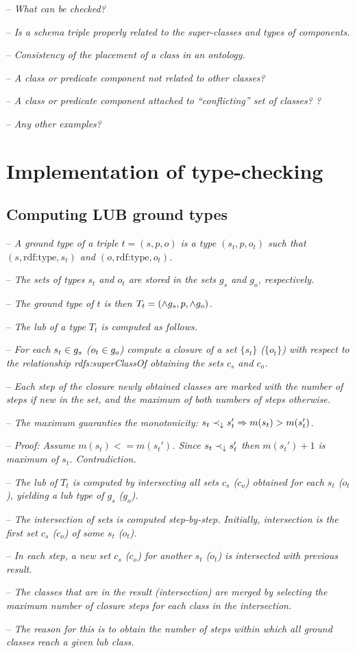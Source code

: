 \documentclass[runningheads]{llncs}
\newcommand{\darr}{\downarrow}
\newcommand{\notes}[1]{\noindent\begin{small}-- \emph{#1}\\\end{small}}
\begin{document}
\notes{What can be checked?}
\notes{Is a schema triple properly related to the super-classes and types of components.}
\notes{Consistency of the placement of a class in an ontology.}
\notes{A class or predicate component not related to other classes?}
\notes{A class or predicate component attached to ``conflicting'' set of classes? ?}
\notes{Any other examples?}





\section{Implementation of type-checking}


\subsection{Computing LUB ground types}

\notes{A ground type of a triple $t=(s,p,o)$ is a type $(s_t,p,o_t)$ such that $(s,\text{rdf:type},s_t)$ and $(o,\text{rdf:type},o_t)$.}
\notes{The sets of types $s_t$ and $o_t$ are stored in the sets $g_s$ and $g_o$, respectively.}
\notes{The ground type of $t$ is then $T_t=(\land\/g_s,p,\land\/g_o)$.}
\notes{The lub of a type $T_t$ is computed as follows.}

\notes{For each $s_t\in\/g_s$ ($o_t\in\/g_o$) compute a closure of a set $\{s_t\}$ ($\{o_t\}$) with respect to the relationship rdfs:superClassOf obtaining the sets $c_s$ and $c_o$.}
\notes{Each step of the closure newly obtained classes are marked with the number of steps if new in the set, and the maximum of both numbers of steps otherwise.}
\notes{The maximum guaranties the monotonicity: $s_t\prec_\darr\/s_t'\Rightarrow\/m(s_t)>m(s_t')$.}
\notes{Proof: Assume $m(s_t)<=m(s_t')$. Since $s_t\prec_\darr\/s_t'$ then $m(s_t')+1$ is maximum of $s_t$. Contradiction.}

\notes{The lub of $T_t$ is computed by intersecting all sets $c_s$ ($c_o$) obtained for each $s_t$ ($o_t$), yielding a lub type of $g_s$ ($g_o$).}
\notes{The intersection of sets is computed step-by-step. Initially, intersection is the first set $c_s$ ($c_o$) of some $s_t$ ($o_t$).}
\notes{In each step, a new set $c_s$ ($c_o$) for another $s_t$ ($o_t$) is intersected with previous result.}
\notes{The classes that are in the result (intersection) are merged by selecting the maximum number of closure steps for each class in the intersection.}
\notes{The reason for this is to obtain the number of steps within which all ground classes reach a given lub class.}
\end{document}
